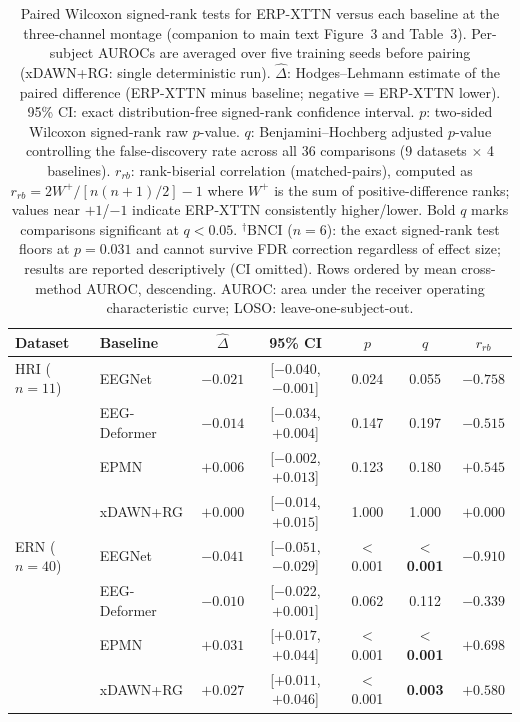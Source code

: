 \begin{table}[t]
\centering
\setlength{\tabcolsep}{4pt}
\caption{%
Paired Wilcoxon signed-rank tests for ERP-XTTN versus each baseline at the three-channel montage (companion to main text Figure~3 and Table~3). Per-subject AUROCs are averaged over five training seeds before pairing (xDAWN+RG: single deterministic run). $\hat{\Delta}$: Hodges--Lehmann estimate of the paired difference (ERP-XTTN minus baseline; negative = ERP-XTTN lower). 95\% CI: exact distribution-free signed-rank confidence interval. $p$: two-sided Wilcoxon signed-rank raw $p$-value. $q$: Benjamini--Hochberg adjusted $p$-value controlling the false-discovery rate across all 36 comparisons (9 datasets $\times$ 4 baselines). $r_{rb}$: rank-biserial correlation (matched-pairs), computed as $r_{rb} = 2W^{+} / [n(n+1)/2] - 1$ where $W^{+}$ is the sum of positive-difference ranks; values near $+1$/$-1$ indicate ERP-XTTN consistently higher/lower. Bold $q$ marks comparisons significant at $q < 0.05$. $^\dagger$BNCI ($n=6$): the exact signed-rank test floors at $p = 0.031$ and cannot survive FDR correction regardless of effect size; results are reported descriptively (CI omitted). Rows ordered by mean cross-method AUROC, descending. AUROC: area under the receiver operating characteristic curve; LOSO: leave-one-subject-out.%
}
\label{sup:tab-wilcoxon}
\begin{tabular}{llccccc}
\toprule
Dataset & Baseline & $\hat{\Delta}$ & 95\% CI & $p$ & $q$ & $r_{rb}$ \\
\midrule
HRI ($n{=}11$) & EEGNet & $-0.021$ & [$-0.040$, $-0.001$] & 0.024 & 0.055 & $-0.758$ \\
 & EEG-Deformer & $-0.014$ & [$-0.034$, $+0.004$] & 0.147 & 0.197 & $-0.515$ \\
 & EPMN & $+0.006$ & [$-0.002$, $+0.013$] & 0.123 & 0.180 & $+0.545$ \\
 & xDAWN+RG & $+0.000$ & [$-0.014$, $+0.015$] & 1.000 & 1.000 & $+0.000$ \\
\midrule
ERN ($n{=}40$) & EEGNet & $-0.041$ & [$-0.051$, $-0.029$] & $<$0.001 & \textbf{$<$0.001} & $-0.910$ \\
 & EEG-Deformer & $-0.010$ & [$-0.022$, $+0.001$] & 0.062 & 0.112 & $-0.339$ \\
 & EPMN & $+0.031$ & [$+0.017$, $+0.044$] & $<$0.001 & \textbf{$<$0.001} & $+0.698$ \\
 & xDAWN+RG & $+0.027$ & [$+0.011$, $+0.046$] & $<$0.001 & \textbf{0.003} & $+0.580$ \\

\end{tabular}
\end{table}
